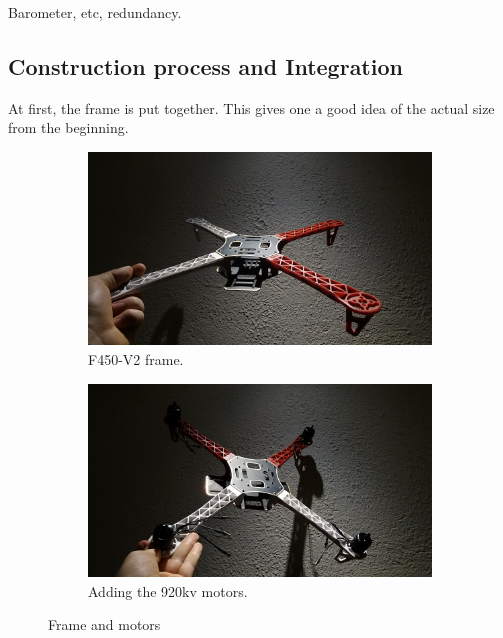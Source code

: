 Barometer, etc, redundancy.

\subsection{Construction process and Integration}

At first, the frame is put together. This gives one a good idea of the actual size from the beginning.

\begin{figure}[H]
\begin{subfigure}{0.5\textwidth}
\centering
\includegraphics[scale=0.1]{images/drone-build-frame.jpg}
\caption{F450-V2 frame.}
\label{fig:frame}
\end{subfigure}
\begin{subfigure}{0.5\textwidth}
\centering
\includegraphics[scale=0.1]{images/drone-build-motors.jpg}
\caption{Adding the 920kv motors.}
\label{fig:motors}
\end{subfigure}
\caption{Frame and motors}
\label{fig:frame_motors}
\end{figure}

